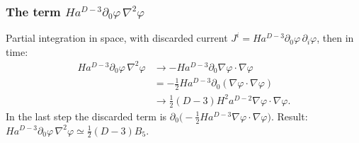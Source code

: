\subsubsection{\texorpdfstring{The term $Ha^{D-3}\partial_0\varphi\,\nabla^2\varphi$}{The term H a**(D-3) d0 phi Lap phi}}
\tD{}
Partial integration in space, with discarded current $J^i=Ha^{D-3}\partial_0\varphi\,\partial_i\varphi$, then in time:
\begin{align*}
Ha^{D-3}\partial_0\varphi\,\nabla^2\varphi&\to-Ha^{D-3}\partial_0\nabla\varphi\cdot\nabla\varphi \tag{I.141}\\
&=-\tfrac12Ha^{D-3}\partial_0(\nabla\varphi\cdot\nabla\varphi) \tag{I.142}\\
&\to\tfrac12(D-3)H^2a^{D-2}\nabla\varphi\cdot\nabla\varphi . \tag{I.143}
\end{align*}
In the last step the discarded term is $\partial_0\big(-\tfrac12Ha^{D-3}\nabla\varphi\cdot\nabla\varphi\big)$.
Result: $Ha^{D-3}\partial_0\varphi\,\nabla^2\varphi\simeq\tfrac12(D-3)B_5$.

